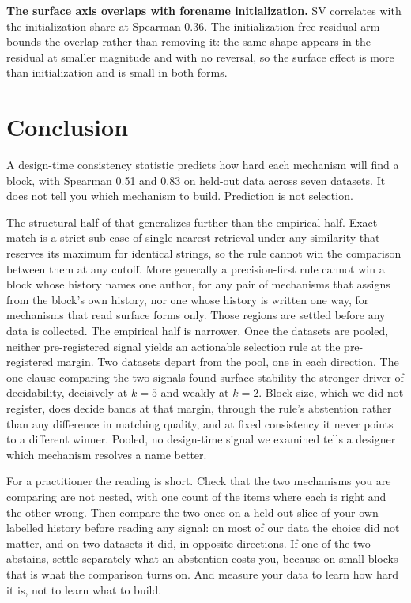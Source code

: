 \documentclass[11pt]{article}
\begin{document}
\textbf{The surface axis overlaps with forename initialization.} SV correlates
with the initialization share at Spearman 0.36. The initialization-free
residual arm bounds the overlap rather than removing it: the same shape
appears in the residual at smaller magnitude and with no reversal, so the
surface effect is more than initialization and is small in both forms.

\section{Conclusion}
\label{sec:conclusion}

A design-time consistency statistic predicts how hard each mechanism will find
a block, with Spearman 0.51 and 0.83 on held-out data across seven datasets.
It does not tell you which mechanism to build. Prediction is not selection.

The structural half of that generalizes further than the empirical half. Exact
match is a strict sub-case of single-nearest retrieval under any similarity
that reserves its maximum for identical strings, so the rule cannot win the
comparison between them at any cutoff. More generally a precision-first rule
cannot win a block whose history names one author, for any pair of mechanisms
that assigns from the block's own history, nor one whose history is written
one way, for mechanisms that read surface forms only. Those regions are
settled before any data is collected. The empirical half is narrower. Once the
datasets are pooled, neither pre-registered signal yields an actionable
selection rule at the pre-registered margin. Two datasets depart from the
pool, one in each direction. The one clause comparing the two signals found
surface stability the stronger driver of decidability, decisively at $k = 5$
and weakly at $k = 2$. Block size, which we
did not register, does decide bands at that margin, through the rule's
abstention rather than any difference in matching quality, and at fixed
consistency it never points to a different winner. Pooled, no design-time
signal we examined tells a designer which mechanism resolves a name better.

For a practitioner the reading is short. Check that the two mechanisms you are
comparing are not nested, with one count of the items where each is right and
the other wrong. Then compare the two once on a held-out slice of your own
labelled history before reading any signal: on most of our data the choice
did not matter, and on two datasets it did, in opposite directions. If one of the two abstains,
settle separately what an abstention costs you, because on small blocks that
is what the comparison turns on. And measure your data to learn how hard it
is, not to learn what to build.
\end{document}
